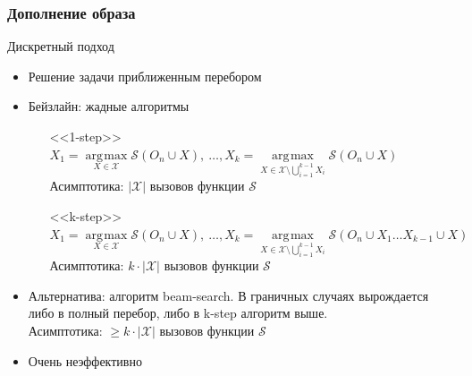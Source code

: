 \documentclass[10pt]{beamer}
\DeclareMathOperator*{\argmax}{\arg\!\max}
\begin{document}
\begin{frame}
	\frametitle{Дополнение образа}
	\begin{block}{Дискретный подход}
		\begin{itemize}
			\item Решение задачи приближенным перебором
			\item Бейзлайн: жадные алгоритмы
			\begin{itemize}
				\item[<<1-step>>] $X_1 = \argmax\limits_{X\in\mathcal{X}}{\mathcal{S}(O_n\cup X)},~\dots , X_k = \argmax\limits_{X\in\mathcal{X}\setminus \bigcup\limits_{i=1}^{k-1} X_i} \mathcal{S}(O_n\cup X)$\\
				Асимптотика: $|\mathcal{X}|$ вызовов функции $\mathcal{S}$\\
				
				\item[<<k-step>>] $X_1 = \argmax\limits_{X\in\mathcal{X}}{\mathcal{S}(O_n\cup X)},~\dots , X_k = \argmax\limits_{X\in\mathcal{X}\setminus \bigcup\limits_{i=1}^{k-1} X_i} \mathcal{S}(O_n\cup X_1\dots X_{k-1}\cup X)$\\
				Асимптотика: $k\cdot|\mathcal{X}|$ вызовов функции $\mathcal{S}$
			\end{itemize}
				
			\item Альтернатива: алгоритм beam-search. В граничных случаях вырождается либо в полный перебор, либо в k-step алгоритм выше.\\
			Асимптотика:  $\geqslant k\cdot|\mathcal{X}|$ вызовов функции $\mathcal{S}$
			\item Очень неэффективно
		\end{itemize}
	\end{block}
\end{frame}
\end{document}
